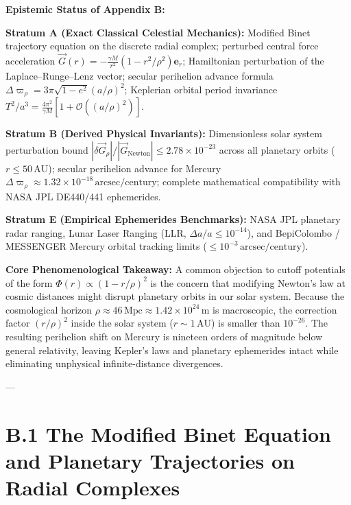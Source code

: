 \documentclass[
    12pt,
    a4paper,
    headings=normal,
    twoside=false,
    open=any,
    parskip=half
]{scrbook}
\begin{document}
\begin{firewallbox}
\textbf{Epistemic Status of Appendix B:}\par\smallskip\noindent
\textbf{Stratum A (Exact Classical Celestial Mechanics):} Modified Binet trajectory equation on the discrete radial complex; perturbed central force acceleration $\vec{G}(r) = -\frac{\gamma M}{r^2}(1 - r^2/\rho^2)\mathbf{e}_r$; Hamiltonian perturbation of the Laplace--Runge--Lenz vector; secular perihelion advance formula $\Delta\varpi_\rho = 3\pi \sqrt{1 - e^2}(a/\rho)^2$; Keplerian orbital period invariance $T^2/a^3 = \frac{4\pi^2}{\gamma M}[1 + \mathcal{O}((a/\rho)^2)]$.\par\smallskip\noindent
\textbf{Stratum B (Derived Physical Invariants):} Dimensionless solar system perturbation bound $|\delta\vec{G}_\rho| / |\vec{G}_{\text{Newton}}| \le 2.78 \times 10^{-23}$ across all planetary orbits ($r \le 50\,\text{AU}$); secular perihelion advance for Mercury $\Delta\varpi_\rho \approx 1.32 \times 10^{-18}\,\text{arcsec/century}$; complete mathematical compatibility with NASA JPL DE440/441 ephemerides.\par\smallskip\noindent
\textbf{Stratum E (Empirical Ephemerides Benchmarks):} NASA JPL planetary radar ranging, Lunar Laser Ranging (LLR, $\Delta a / a \le 10^{-14}$), and BepiColombo / MESSENGER Mercury orbital tracking limits ($\le 10^{-3}\,\text{arcsec/century}$).\par\smallskip\noindent
\textbf{Core Phenomenological Takeaway:} A common objection to cutoff potentials of the form $\Phi(r) \propto (1 - r/\rho)^2$ is the concern that modifying Newton's law at cosmic distances might disrupt planetary orbits in our solar system. Because the cosmological horizon $\rho \approx 46\,\text{Mpc} \approx 1.42 \times 10^{24}\,\text{m}$ is macroscopic, the correction factor $(r/\rho)^2$ inside the solar system ($r \sim 1\,\text{AU}$) is smaller than $10^{-26}$. The resulting perihelion shift on Mercury is nineteen orders of magnitude below general relativity, leaving Kepler's laws and planetary ephemerides intact while eliminating unphysical infinite-distance divergences.
\end{firewallbox}

---

\section{B.1 The Modified Binet Equation and Planetary Trajectories on Radial Complexes}
\label{sec:appB_modified_binet}
\end{document}
